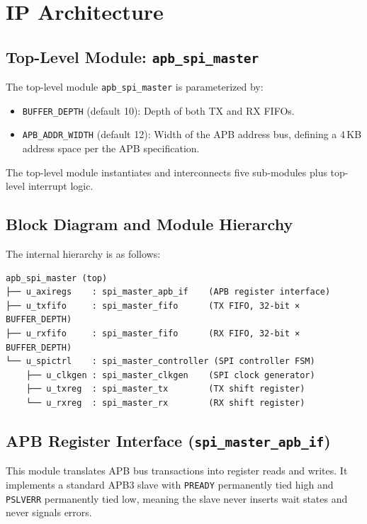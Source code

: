 \chapter{IP Architecture}
\label{ch:ip_arch}

\section{Top-Level Module: \texttt{apb\_spi\_master}}

The top-level module \texttt{apb\_spi\_master} is parameterized by:
\begin{itemize}[leftmargin=2em]
  \item \texttt{BUFFER\_DEPTH} (default 10): Depth of both TX and RX FIFOs.
  \item \texttt{APB\_ADDR\_WIDTH} (default 12): Width of the APB address bus, defining a 4\,KB
        address space per the APB specification.
\end{itemize}

The top-level module instantiates and interconnects five sub-modules plus top-level interrupt logic.

\section{Block Diagram and Module Hierarchy}

The internal hierarchy is as follows:

\begin{verbatim}
apb_spi_master (top)
├── u_axiregs    : spi_master_apb_if    (APB register interface)
├── u_txfifo     : spi_master_fifo      (TX FIFO, 32-bit × BUFFER_DEPTH)
├── u_rxfifo     : spi_master_fifo      (RX FIFO, 32-bit × BUFFER_DEPTH)
└── u_spictrl    : spi_master_controller (SPI controller FSM)
    ├── u_clkgen : spi_master_clkgen    (SPI clock generator)
    ├── u_txreg  : spi_master_tx        (TX shift register)
    └── u_rxreg  : spi_master_rx        (RX shift register)
\end{verbatim}

\section{APB Register Interface (\texttt{spi\_master\_apb\_if})}

This module translates APB bus transactions into register reads and writes. It implements a
standard APB3 slave with \texttt{PREADY} permanently tied high and \texttt{PSLVERR} permanently
tied low, meaning the slave never inserts wait states and never signals errors.

